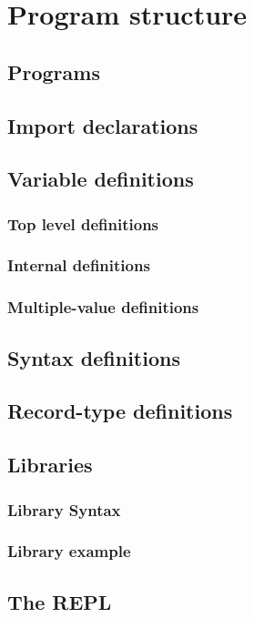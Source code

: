 \chapter{Program structure}
\label{programchapter}

\section{Programs}

\section{Import declarations}

\section{Variable definitions}
\label{defines}

\subsection{Top level definitions}

\subsection{Internal definitions}
\label{internaldefines}

\subsection{Multiple-value definitions}

\section{Syntax definitions}

\section{Record-type definitions}
\label{usertypes}

\section{Libraries}
\label{libraries}

\subsection{Library Syntax}

\subsection{Library example}


\section{The REPL}
